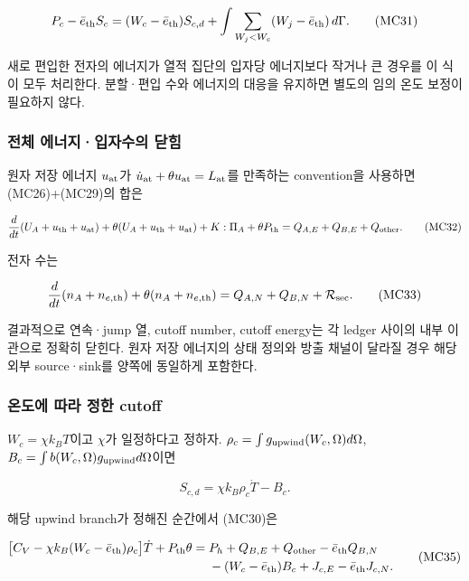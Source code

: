 \[
P_c-\bar e_{\rm th}S_c
=(W_c-\bar e_{\rm th})S_{c,d}
+\int\sum_{W_j<W_c}(W_j-\bar e_{\rm th})\,d\Gamma.
\tag{MC31}
\]

새로 편입한 전자의 에너지가 열적 집단의 입자당 에너지보다 작거나 큰 경우를 이 식이 모두 처리한다. 분할·편입 수와 에너지의 대응을 유지하면 별도의 임의 온도 보정이 필요하지 않다.

\hypertarget{uxc804uxccb4-uxc5d0uxb108uxc9c0uxc785uxc790uxc218uxc758-uxb2ebuxd798}{%
\subsubsection{전체 에너지·입자수의 닫힘}\label{uxc804uxccb4-uxc5d0uxb108uxc9c0uxc785uxc790uxc218uxc758-uxb2ebuxd798}}

원자 저장 에너지 \(u_{\rm at}\)가 \(\dot u_{\rm at}+\theta u_{\rm at}=L_{\rm at}\)를 만족하는 convention을 사용하면 (MC26)+(MC29)의 합은

\[
\frac d{dt}(U_A+u_{\rm th}+u_{\rm at})
+\theta(U_A+u_{\rm th}+u_{\rm at})
+K:\Pi_A+\theta P_{\rm th}
=Q_{A,E}+Q_{B,E}+Q_{\rm other}.
\tag{MC32}
\]

전자 수는

\[
\frac d{dt}(n_A+n_{e,\rm th})
+\theta(n_A+n_{e,\rm th})
=Q_{A,N}+Q_{B,N}+\mathcal R_{\rm sec}.
\tag{MC33}
\]

결과적으로 연속·jump 열, cutoff number, cutoff energy는 각 ledger 사이의 내부 이관으로 정확히 닫힌다. 원자 저장 에너지의 상태 정의와 방출 채널이 달라질 경우 해당 외부 source·sink를 양쪽에 동일하게 포함한다.

\hypertarget{uxc628uxb3c4uxc5d0-uxb530uxb77c-uxc815uxd55c-cutoff}{%
\subsubsection{온도에 따라 정한 cutoff}\label{uxc628uxb3c4uxc5d0-uxb530uxb77c-uxc815uxd55c-cutoff}}

\(W_c=\chi k_BT\)이고 \(\chi\)가 일정하다고 정하자. \(\rho_c=\int g_{\rm upwind}(W_c,\Omega)d\Omega\), \(B_c=\int b(W_c,\Omega)g_{\rm upwind}d\Omega\)이면

\[
S_{c,d}=\chi k_B\rho_c\dot T-B_c.
\tag{MC34}
\]

해당 upwind branch가 정해진 순간에서 (MC30)은

\[
\begin{split}
\big[C_V-\chi k_B(W_c-\bar e_{\rm th})\rho_c\big]\dot T
+P_{\rm th}\theta
={}&P_h+Q_{B,E}+Q_{\rm other}-\bar e_{\rm th}Q_{B,N}\\
&-(W_c-\bar e_{\rm th})B_c
+J_{c,E}-\bar e_{\rm th}J_{c,N}.
\end{split}
\tag{MC35}
\]

